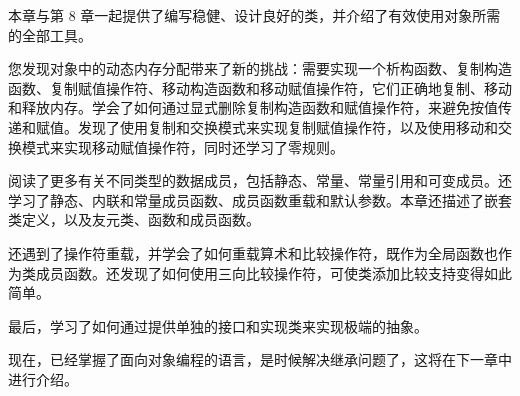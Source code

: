 本章与第 8 章一起提供了编写稳健、设计良好的类，并介绍了有效使用对象所需的全部工具。

您发现对象中的动态内存分配带来了新的挑战：需要实现一个析构函数、复制构造函数、复制赋值操作符、移动构造函数和移动赋值操作符，它们正确地复制、移动和释放内存。学会了如何通过显式删除复制构造函数和赋值操作符，来避免按值传递和赋值。发现了使用复制和交换模式来实现复制赋值操作符，以及使用移动和交换模式来实现移动赋值操作符，同时还学习了零规则。

阅读了更多有关不同类型的数据成员，包括静态、常量、常量引用和可变成员。还学习了静态、内联和常量成员函数、成员函数重载和默认参数。本章还描述了嵌套类定义，以及友元类、函数和成员函数。

还遇到了操作符重载，并学会了如何重载算术和比较操作符，既作为全局函数也作为类成员函数。还发现了如何使用三向比较操作符，可使类添加比较支持变得如此简单。

最后，学习了如何通过提供单独的接口和实现类来实现极端的抽象。

现在，已经掌握了面向对象编程的语言，是时候解决继承问题了，这将在下一章中进行介绍。